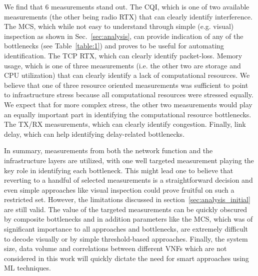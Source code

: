 \documentclass[journal,comsoc]{IEEEtran}
\begin{document}
We find that 6 measurements stand out.
The CQI, which is one of two available measurements (the other being radio RTX) that can clearly identify interference. 
The MCS, which while not easy to understand through simple (e.g. visual) inspection as shown in Sec.~\ref{sec:analysis}, can provide indication of any of the bottlenecks (see Table~\ref{table:1}) and proves to be useful for automating identification. 
The TCP RTX, which can clearly identify packet-loss. 
Memory usage, which is one of three measurements (i.e. the other two are storage and CPU utilization) that can clearly identify a lack of computational resources. 
We believe that one of three resource oriented measurements was sufficient to point to infrastructure stress because all computational resources were stressed equally. 
We expect that for more complex stress, the other two measurements would play an equally important part in identifying the computational resource bottlenecks. 
The TX/RX measurements, which can clearly identify congestion. 
Finally, link delay, which can help identifying delay-related bottlenecks. 

In summary, measurements from both the network function and the infrastructure layers are utilized, with one well targeted measurement playing the key role in identifying each bottleneck. 
This might lead one to believe that reverting to a handful of selected measurements is a straightforward decision and even simple approaches like visual inspection could prove fruitful on such a restricted set.
However, the limitations discussed in section~\ref{sec:analysis_initial} are still valid. %
The value of the targeted measurements can be quickly obscured by composite bottlenecks and in addition parameters like the MCS, which was of significant importance to all approaches and bottlenecks, are extremely difficult to decode visually or by simple threshold-based approaches.
Finally, the system size, data volume and correlations between different VNFs which are not considered in this work will quickly dictate the need for smart approaches using ML techniques.
\end{document}
